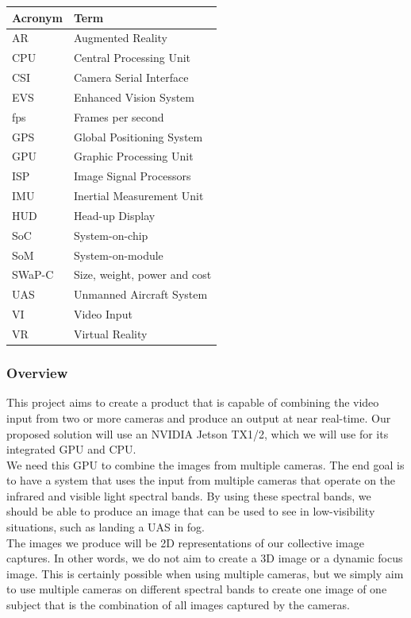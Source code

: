 \documentclass[letterpaper,10pt,serif,draftclsnofoot,onecolumn,compsoc,titlepage]{IEEEtran}
\begin{document}
\begin{tabular}{|l|l|}
	\hline
	\textbf{Acronym} & \textbf{Term}\\
	\hline
	AR & Augmented Reality\\
	\hline
	CPU & Central Processing Unit\\
	\hline
	CSI & Camera Serial Interface\\
	\hline
	EVS & Enhanced Vision System\\
	\hline
	fps & Frames per second\\
	\hline
	GPS & Global Positioning System\\
	\hline
	GPU & Graphic Processing Unit\\
	\hline
	ISP & Image Signal Processors\\
	\hline
	IMU & Inertial Measurement Unit\\
	\hline
	HUD & Head-up Display\\
	\hline
	SoC & System-on-chip\\
	\hline
	SoM & System-on-module\\
	\hline
	SWaP-C & Size, weight, power and cost\\
	\hline
	UAS & Unmanned Aircraft System\\
	\hline
	VI & Video Input\\
	\hline
	VR & Virtual Reality\\
	\hline
\end{tabular}

\subsubsection{Overview}

This project aims to create a product that is capable of combining the video input from 
two or more cameras and produce an output at near real-time. Our proposed solution 
will use an NVIDIA Jetson TX1/2, which we will use for its integrated GPU and CPU.\\

We need this GPU to combine the images from multiple cameras. The end goal is to have 
a system that uses the input from multiple cameras that operate on the infrared and 
visible light spectral bands. By using these spectral bands, we should be able to 
produce an image that can be used to see in low-visibility situations, such as landing 
a UAS in fog.\\

The images we produce will be 2D representations of our collective image captures. In 
other words, we do not aim to create a 3D image or a dynamic focus image. This is 
certainly possible when using multiple cameras, but we simply aim to use multiple 
cameras on different spectral bands to create one image of one subject that is the 
combination of all images captured by the cameras.\\
\end{document}

